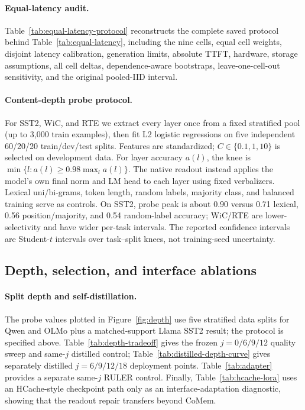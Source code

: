 



\paragraph{Equal-latency audit.}


Table~\ref{tab:equal-latency-protocol} reconstructs the complete saved protocol
behind Table~\ref{tab:equal-latency}, including the nine cells, equal cell
weights, disjoint latency calibration, generation limits, absolute TTFT,
hardware, storage assumptions, all cell deltas, dependence-aware bootstraps,
leave-one-cell-out sensitivity, and the original pooled-IID interval.



\paragraph{Content-depth probe protocol.}
For SST2, WiC, and RTE we extract every layer once from a fixed stratified pool
(up to 3,000 train examples), then fit L2 logistic regressions on five independent
60/20/20 train/dev/test splits. Features are standardized; $C\in\{0.1,1,10\}$
is selected on development data. For layer accuracy $a(l)$, the knee is
$\min\{l:a(l)\geq0.98\max_l a(l)\}$. The native readout instead applies the
model's own final norm and LM head to each layer using fixed verbalizers. Lexical
uni/bi-grams, token length, random labels, majority class, and balanced training
serve as controls. On SST2, probe peak is about 0.90 versus 0.71 lexical, 0.56
position/majority, and 0.54 random-label accuracy; WiC/RTE are lower-selectivity
and have wider per-task intervals. The reported confidence intervals are
Student-$t$ intervals over task--split knees, not training-seed uncertainty.

\subsection{Depth, selection, and interface ablations}
\label{app:ablations}

\paragraph{Split depth and self-distillation.}
The probe values plotted in Figure~\ref{fig:depth} use five stratified data
splits for Qwen and OLMo plus a matched-support Llama SST2 result; the protocol
is specified above. Table~\ref{tab:depth-tradeoff} gives the frozen
$j=0/6/9/12$ quality sweep and same-$j$ distilled control;
Table~\ref{tab:distilled-depth-curve} gives separately distilled
$j=6/9/12/18$ deployment points. Table~\ref{tab:adapter} provides a separate
same-$j$ RULER control.
Finally, Table~\ref{tab:hcache-lora} uses an HCache-style checkpoint path only
as an interface-adaptation diagnostic, showing that the readout repair transfers
beyond CoMem.

